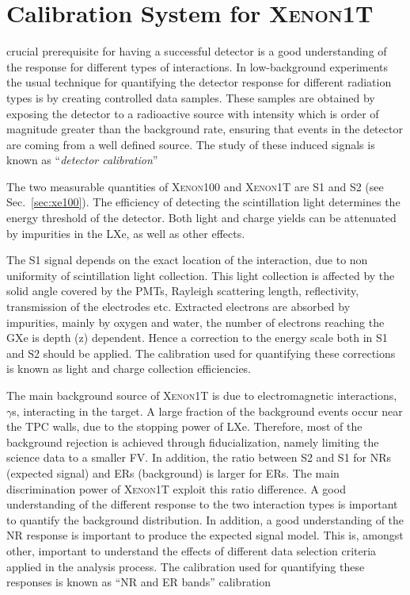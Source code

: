 %
%
\let\textcircled=\pgftextcircled

\chapter{Calibration System for \textsc{Xenon1T}} \label{chap:calib}
\label{chap:calibration}
 crucial prerequisite for having a successful detector is a good understanding of the response for different types of interactions. In low-background experiments the usual technique for quantifying the detector response for different radiation types is by creating controlled data samples. These samples are obtained by exposing the detector to a radioactive source with intensity which is order of magnitude greater than the background rate, ensuring that events in the detector are coming from a well defined source. The study of these induced signals is known as ``\textit{detector calibration}'' 

The two measurable quantities of \textsc{Xenon100} and \textsc{Xenon1T} are S1 and S2 (see Sec.~\ref{sec:xe100}). The efficiency of detecting the scintillation light determines the energy threshold of the detector. Both light and charge yields can be attenuated by impurities in the LXe, as well as other effects. 

The S1 signal depends on the exact location of the interaction, due to non uniformity of scintillation light collection. This light collection is affected by the solid angle covered by the PMTs, Rayleigh scattering length, reflectivity, transmission of the electrodes etc. Extracted electrons are absorbed by impurities, mainly by oxygen and water, the number of electrons reaching the GXe is depth (z) dependent. Hence a correction to the energy scale both in S1 and S2 should be applied. The calibration used for quantifying these corrections is known as light and charge collection efficiencies. 

The main background source of \textsc{Xenon1T} is due to electromagnetic interactions, $\gamma$s, interacting in the target. A large fraction of the background events occur near the TPC walls, due to the stopping power of LXe. Therefore, most of the background rejection is achieved through fiducialization, namely limiting the science data to a smaller FV. In addition, the ratio between S2 and S1 for NRs (expected signal) and ERs (background) is larger for ERs. The main discrimination power of \textsc{Xenon1T} exploit this ratio difference. A good understanding of the different response to the two interaction types is important to quantify the background distribution. In addition, a good understanding of the NR response is important to produce the expected signal model. This is, amongst other, important to understand the effects of different data selection criteria applied in the analysis process. The calibration used for quantifying these responses is known as ``NR and ER bands'' calibration    

